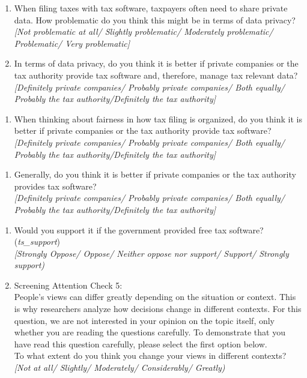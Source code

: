 \documentclass[11pt]{article}
\begin{document}
\begin{enumerate}[resume]
    \item When filing taxes with tax software, taxpayers often need to share private data. How problematic do you think this might be in terms of data privacy? \\
    \textit{[Not problematic at all/ Slightly problematic/ Moderately problematic/ Problematic/ Very problematic]}
    \item \label{question:providerdataprivacy} In terms of data privacy, do you think it is better if private companies or the tax authority provide tax software and, therefore, manage tax relevant data? \\
    \textit{[Definitely private companies/ Probably private companies/ Both equally/ Probably the tax authority/Definitely the tax authority]}
\end{enumerate}
\begin{enumerate}[resume]
    \item \label{question:providerfairness} When thinking about fairness in how tax filing is organized, do you think it is better if private companies or the tax authority provide tax software?  \\
    \textit{[Definitely private companies/ Probably private companies/ Both equally/ Probably the tax authority/Definitely the tax authority]}
\end{enumerate}

\vspace{0.5em}
\begin{enumerate}[resume]
    \item \label{question:providergeneral} Generally, do you think it is better if private companies or the tax authority provides tax software?\\
    \textit{[Definitely private companies/ Probably private companies/ Both equally/ Probably the tax authority/Definitely the tax authority]}
\end{enumerate}
\begin{enumerate}[resume]
    \item Would you support it if the government provided free tax software? (\textit{ts\_support})\\
    \textit{[Strongly Oppose/ Oppose/ Neither oppose nor support/ Support/ Strongly support)}
    \item Screening Attention Check 5: \\ People's views can differ greatly depending on the situation or context. This is why researchers analyze how decisions change in different contexts. For this question, we are not interested in your opinion on the topic itself, only whether you are reading the questions carefully. To demonstrate that you have read this question carefully, please select the first option below. \\[0.25em] To what extent do you think you change your views in different contexts? \\ \textit{[Not at all/ Slightly/ Moderately/ Considerably/ Greatly)}
\end{enumerate}
\end{document}
